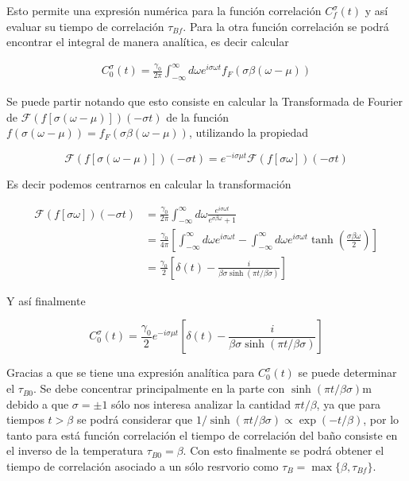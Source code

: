 \begin{appendixs}
Esto permite una expresión numérica para la función correlación $C^{\sigma}_{f}(t)$ y así evaluar su tiempo de correlación $\tau_{Bf}$. Para la otra función correlación se podrá encontrar el integral de manera analítica, es decir calcular

\begin{align*}
       C_{0}^{\sigma}(t) = \frac{\gamma_{0}}{2\pi} \int_{-\infty}^{\infty} d\omega e^{i\sigma \omega t }f_{F}(\sigma \beta (\omega -  \mu))
\end{align*}    

Se puede partir notando que esto consiste en calcular la Transformada de Fourier de $\mathcal{F}(f[\sigma (\omega - \mu)])(-\sigma t)$ de la función $f(\sigma(\omega-\mu))= f_{F}(\sigma \beta (\omega-\mu) )$, utilizando la propiedad

\begin{equation*}
\mathcal{F}(f[\sigma (\omega - \mu)])(-\sigma t) = e^{-i \sigma \mu t}\mathcal{F}(f[\sigma \omega])(-\sigma t)
\end{equation*}

Es decir podemos centrarnos en calcular la transformación

\begin{align*}
    \mathcal{F}(f[\sigma \omega])(-\sigma t) &= \frac{\gamma_{0}}{2\pi} \int_{-\infty}^{\infty} d\omega \frac{e^{i\sigma \omega t}}{e^{\sigma \beta \omega} +1 } \\
        & = \frac{\gamma_{0}}{4\pi} \left[\int_{-\infty}^{\infty}d \omega e^{i\sigma \omega t} - \int_{-\infty}^{\infty}d\omega e^{i\sigma \omega t} \tanh \left(\frac{ \sigma \beta \omega }{2} \right)   \right] \\
        & =  \frac{\gamma_{0}}{2} \left[\delta(t) - \frac{i}{\beta \sigma \sinh(\pi t/\beta \sigma)} \right]
\end{align*}

Y así finalmente

\begin{equation*}
    C^{\sigma}_{0}(t) = \frac{\gamma_{0}}{2}e^{-i\sigma \mu t} \left[\delta(t) - \frac{i}{\beta \sigma \sinh(\pi t/\beta \sigma)} \right]
\end{equation*}

Gracias a que se tiene una expresión analítica para $C^{\sigma}_{0}(t)$ se puede determinar el $\tau_{B0}$. Se debe concentrar principalmente en la parte con $\sinh(\pi t/\beta \sigma)$m debido a que $\sigma=\pm 1$ sólo nos interesa analizar la cantidad $\pi t/\beta$, ya que para tiempos $t > \beta$ se podrá considerar que $1/\sinh(\pi t/\beta \sigma) \propto \exp(-t/\beta)$, por lo tanto para está función correlación el tiempo de correlación del baño consiste en el inverso de la temperatura $\tau_{B0} = \beta$. Con esto finalmente se podrá obtener el tiempo de correlación asociado a un sólo resrvorio como $\tau_{B} = \max \{\beta,\tau_{Bf} \}$.  


\end{appendixs}
